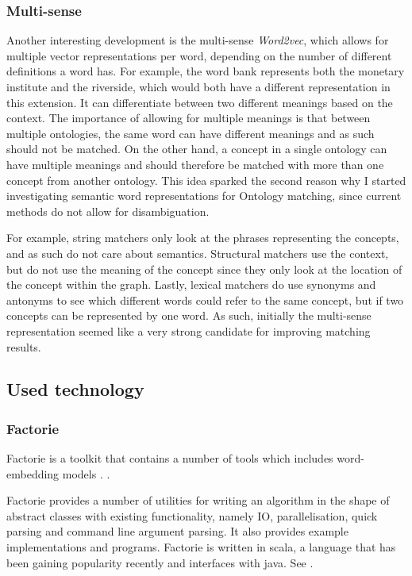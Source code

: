 \documentclass{article}
\begin{document}
 \subsubsection{Multi-sense} \label{multisense}
 Another interesting development is the multi-sense \emph{Word2vec}, which allows for multiple vector representations per word, depending on the number of different definitions a word has. For example, the word bank represents both the monetary institute and the riverside, which would both have a different representation in this extension. It can differentiate between two different meanings based on the context. The importance of allowing for multiple meanings is that between multiple ontologies, the same word can have different meanings and as such should not be matched. On the other hand, a concept in a single ontology can have multiple meanings and should therefore be matched with more than one concept from another ontology\cite{multisense}. This idea sparked the second reason why I started investigating semantic word representations for Ontology matching, since current methods do not allow for disambiguation.
 
 For example, string matchers only look at the phrases representing the concepts, and as such do not care about semantics. Structural matchers use the context, but do not use the meaning of the concept since they only look at the location of the concept within the graph. Lastly, lexical matchers do use synonyms and antonyms to see which different words could refer to the same concept, but if two concepts can be represented by one word. As such, initially the multi-sense representation seemed like a very strong candidate for improving matching results.
 
 \subsection{Used technology}
 \subsubsection{Factorie} \label{factorie}
 Factorie is a toolkit that contains a number of tools which includes word-embedding models \cite{git-factorie}. \cite{w2v}.
 
 Factorie provides a number of utilities for writing an algorithm in the shape of abstract classes with existing functionality, namely IO, parallelisation, quick parsing and command line argument parsing. It also provides example implementations and programs. Factorie is written in scala, a language that has been gaining popularity recently and interfaces with java. See \cite{scala}. 
 
\end{document}
